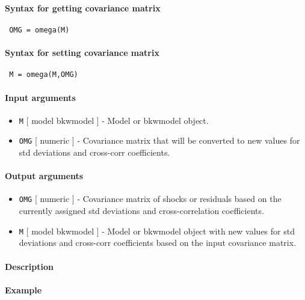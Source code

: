 


	\paragraph{Syntax for getting covariance matrix}
 
 \begin{verbatim}
 OMG = omega(M)
 \end{verbatim}
 
 \paragraph{Syntax for setting covariance matrix}
 
 \begin{verbatim}
 M = omega(M,OMG)
 \end{verbatim}
 
 \paragraph{Input arguments}
 
 \begin{itemize}
 \item
   \texttt{M} {[} model \textbar{} bkwmodel {]} - Model or bkwmodel
   object.
 \item
   \texttt{OMG} {[} numeric {]} - Covariance matrix that will be
   converted to new values for std deviations and cross-corr
   coefficients.
 \end{itemize}
 
 \paragraph{Output arguments}
 
 \begin{itemize}
 \item
   \texttt{OMG} {[} numeric {]} - Covariance matrix of shocks or
   residuals based on the currently assigned std deviations and
   cross-correlation coefficients.
 \item
   \texttt{M} {[} model \textbar{} bkwmodel {]} - Model or bkwmodel
   object with new values for std deviations and cross-corr coefficients
   based on the input covariance matrix.
 \end{itemize}
 
 \paragraph{Description}
 
 \paragraph{Example}


